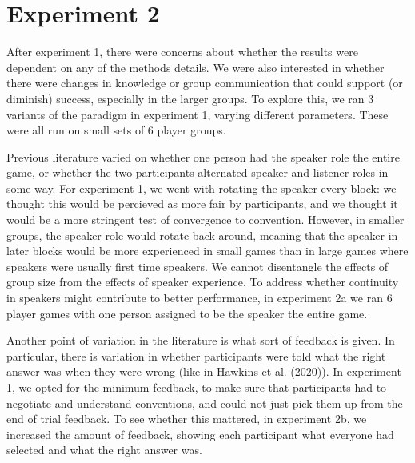 \documentclass[
  english,
  a4paper,
]{article}
\begin{document}
\hypertarget{experiment-2}{%
\section{Experiment 2}\label{experiment-2}}

After experiment 1, there were concerns about whether the results were dependent on any of the methods details. We were also interested in whether there were changes in knowledge or group communication that could support (or diminish) success, especially in the larger groups. To explore this, we ran 3 variants of the paradigm in experiment 1, varying different parameters. These were all run on small sets of 6 player groups.

Previous literature varied on whether one person had the speaker role the entire game, or whether the two participants alternated speaker and listener roles in some way. For experiment 1, we went with rotating the speaker every block: we thought this would be percieved as more fair by participants, and we thought it would be a more stringent test of convergence to convention. However, in smaller groups, the speaker role would rotate back around, meaning that the speaker in later blocks would be more experienced in small games than in large games where speakers were usually first time speakers. We cannot disentangle the effects of group size from the effects of speaker experience. To address whether continuity in speakers might contribute to better performance, in experiment 2a we ran 6 player games with one person assigned to be the speaker the entire game.

Another point of variation in the literature is what sort of feedback is given. In particular, there is variation in whether participants were told what the right answer was when they were wrong (like in Hawkins et al. (\protect\hyperlink{ref-hawkinsCharacterizingDynamicsLearning2020}{2020})). In experiment 1, we opted for the minimum feedback, to make sure that participants had to negotiate and understand conventions, and could not just pick them up from the end of trial feedback. To see whether this mattered, in experiment 2b, we increased the amount of feedback, showing each participant what everyone had selected and what the right answer was.
\end{document}
